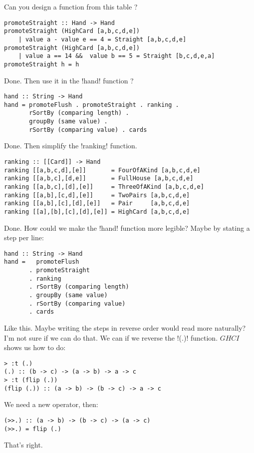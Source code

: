 \lhN Can you design a function from this table ?
\lhA
\begin{lstlisting}[frame=single]
promoteStraight :: Hand -> Hand
promoteStraight (HighCard [a,b,c,d,e]) 
    | value a - value e == 4 = Straight [a,b,c,d,e]
promoteStraight (HighCard [a,b,c,d,e]) 
    | value a == 14 &&  value b == 5 = Straight [b,c,d,e,a]
promoteStraight h = h
\end{lstlisting}
\success Done.
\lhN Then use it in the \il!hand! function ?
\lhA
\begin{lstlisting}[frame=single]
hand :: String -> Hand
hand = promoteFlush . promoteStraight . ranking . 
       rSortBy (comparing length) .
       groupBy (same value) . 
       rSortBy (comparing value) . cards
\end{lstlisting}
\success Done.
\lhN Then simplify the \il!ranking! function.
\lhA
\begin{lstlisting}[frame=single]
ranking :: [[Card]] -> Hand
ranking [[a,b,c,d],[e]]       = FourOfAKind [a,b,c,d,e]
ranking [[a,b,c],[d,e]]       = FullHouse [a,b,c,d,e]
ranking [[a,b,c],[d],[e]]     = ThreeOfAKind [a,b,c,d,e]
ranking [[a,b],[c,d],[e]]     = TwoPairs [a,b,c,d,e]
ranking [[a,b],[c],[d],[e]]   = Pair     [a,b,c,d,e]
ranking [[a],[b],[c],[d],[e]] = HighCard [a,b,c,d,e] 
\end{lstlisting}
\success Done.
\lhN How could we make the \il!hand! function more legible?
\lhA Maybe by stating a step per line:
\begin{lstlisting}[frame=single]
hand :: String -> Hand
hand =   promoteFlush    
       . promoteStraight
       . ranking 
       . rSortBy (comparing length)
       . groupBy (same value)
       . rSortBy (comparing value)
       . cards                     
\end{lstlisting}
\success Like this.
\lhN Maybe writing the steps in reverse order would read more naturally?
\lhA I'm not sure if we can do that.
\newpage
\lhN We can if we reverse the \il!(.)! function. $GHCI$ shows us how to do:
\begin{small}
\begin{verbatim}
> :t (.)
(.) :: (b -> c) -> (a -> b) -> a -> c
> :t (flip (.))
(flip (.)) :: (a -> b) -> (b -> c) -> a -> c
\end{verbatim}
\end{small}
\lhA We need a new operator, then:
\begin{lstlisting}[frame=single]
(>>.) :: (a -> b) -> (b -> c) -> (a -> c)
(>>.) = flip (.)
\end{lstlisting}
\lhN That's right.
